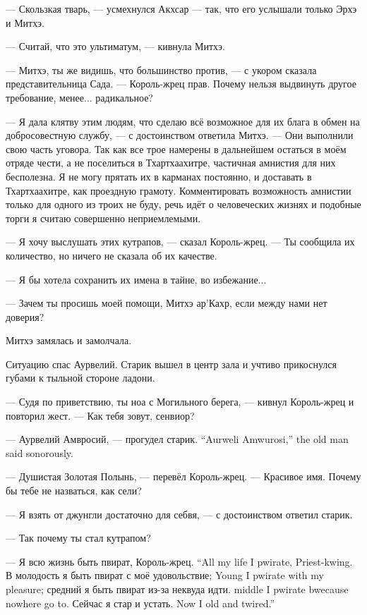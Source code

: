 --- Скользкая тварь, --- усмехнулся Акхсар --- так, что его услышали только Эрхэ и Митхэ.

--- Считай, что это ультиматум, --- кивнула Митхэ.

--- Митхэ, ты же видишь, что большинство против, --- с укором сказала представительница Сада.
--- Король-жрец прав.
Почему нельзя выдвинуть другое требование, менее... радикальное?

--- Я дала клятву этим людям, что сделаю всё возможное для их блага в обмен на добросовестную службу, --- с достоинством ответила Митхэ.
--- Они выполнили свою часть уговора.
Так как все трое намерены в дальнейшем остаться в моём отряде чести, а не поселиться в Тхартхаахитре, частичная амнистия для них бесполезна.
Я не могу прятать их в карманах постоянно, и доставать в Тхартхаахитре, как проездную грамоту.
Комментировать возможность амнистии только для одного из троих не буду, речь идёт о человеческих жизнях и подобные торги я считаю совершенно неприемлемыми.

--- Я хочу выслушать этих кутрапов, --- сказал Король-жрец.
--- Ты сообщила их количество, но ничего не сказала об их качестве.

--- Я бы хотела сохранить их имена в тайне, во избежание...

--- Зачем ты просишь моей помощи, Митхэ ар'Кахр, если между нами нет доверия?

Митхэ замялась и замолчала.

Ситуацию спас Аурвелий.
Старик вышел в центр зала и учтиво прикоснулся губами к тыльной стороне ладони.

--- Судя по приветствию, ты ноа с Могильного берега, --- кивнул Король-жрец и повторил жест.
--- Как тебя зовут, сенвиор?

{--- Аурвелий Амвросий, --- прогудел старик.}
{``Aurweli Amwurosi,'' the old man said sonorously.}

--- Душистая Золотая Полынь, --- перевёл Король-жрец.
--- Красивое имя.
Почему бы тебе не назваться, как сели?

--- Я взять от джунгли достаточно для себвя, --- с достоинством ответил старик.

--- Так почему ты стал кутрапом?

{--- Я всю жизнь быть пвират, Король-жрец.}
{``All my life I pwirate, Priest-kwing.}
{В молодость я быть пвират с моё удовольствие;}
{Young I pwirate with my pleasure;}
{средний я быть пвират из-за неквуда идти.}
{middle I pwirate bwecause nowhere go to.}
{Сейчас я стар и устать.}
{Now I old and twired.''}

